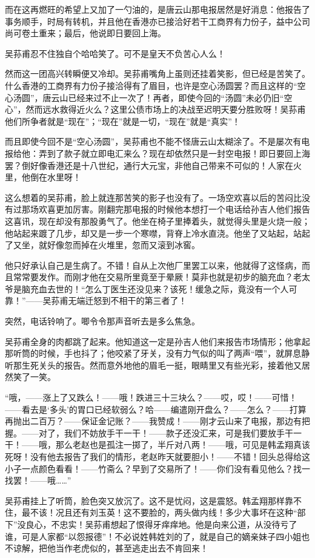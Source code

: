 \par 而在这再燃旺的希望上又加了一勺油的，是唐云山那电报居然是好消息：他报告了事务顺手，时局有转机，并且他在香港亦已接洽好若干工商界有力份子，益中公司尚可卷土重来；最后，他说即日要回上海。
\par 吴荪甫忍不住独自个哈哈笑了。可不是皇天不负苦心人么！
\par 然而这一团高兴转瞬便又冷却。吴荪甫嘴角上虽则还挂着笑影，但已经是苦笑了。什么香港的工商界有力份子接洽得有了眉目，也许是空心汤圆罢？而且这样的“空心汤圆”，唐云山已经来过不止一次了！再者，即使今回的“汤圆”未必仍旧“空心”，然而远水救得近火么？这里公债市场上的决战至迟明天要分胜败呀！吴荪甫他们所争者就是“现在”；“现在”就是一切，“现在”就是“真实”！
\par 而且即使今回不是“空心汤圆”，吴荪甫也不能不怪唐云山太糊涂了。不是屡次有电报给他：弄到了款子就立即电汇来么？现在却依然只是一封空电报！即日要回上海罢？倒好像香港还是十八世纪，通行大元宝，非他自己带来不可似的！人家在火里，他倒在水里呀！
\par 这么想着的吴荪甫，脸上就连那苦笑的影子也没有了。一场空欢喜以后的苦闷比没有过那场欢喜更加厉害。刚翻完那电报的时候他本想打一个电话给孙吉人他们报告这喜讯，现在却没有那股勇气了。他坐在椅子里捧着头，就觉得头里是火烧一般；他站起来踱了几步，却又是一步一个寒噤，背脊上冷水直浇。他坐了又站起，站起了又坐，就好像忽而掉在火堆里，忽而又滚到冰窖。
\par 他只好承认自己是生病了。不错！自从上次他厂里罢工以来，他就得了这怪病，而且常常要发作。而刚才他在交易所里竟至于晕厥！莫非也就是初步的脑充血？老太爷是脑充血去世的！“怎么丁医生还没见来？该死！缓急之际，竟没有一个人可靠！”——吴荪甫无端迁怒到不相干的第三者了！
\par 突然，电话铃响了。唧令令那声音听去是多么焦急。
\par 吴荪甫全身的肉都跳了起来。他知道这一定是孙吉人他们来报告市场情形；他拿起那听筒的时候，手也抖了；他咬紧了牙关，没有力气似的叫了两声“喂”，就屏息静听那生死关头的报告。然而意外地他的眉毛一挺，眼睛里又有些光彩，接着他又居然笑了一笑。
\par “哦，——涨上了又跌么！——哦！跌进三十三块么？——哎，哎！——可惜！——看去是‘多头’的胃口已经软弱么？哈——编遣刚开盘么？——怎么？——打算再抛出二百万？——保证金记账？——我赞成！——刚才云山来了电报，那边有把握。——对了，我们不妨放手干一干！——款子还没汇来，可是我们要放手干一干！——哦，那么老赵也是孤注一掷了，半斤对八两！——哦，可见是韩孟翔真该死呀！没有他去报告了我们的情形，老赵昨天就要胆小！——不错！回头总得给这小子一点颜色看看！——竹斋么？早到了交易所了！——你们没有看见他么？找一找罢！——哦……”
\par 吴荪甫挂上了听筒，脸色突又放沉了。这不是忧闷，这是震怒。韩孟翔那样靠不住，最不该！况且还有刘玉英！这不要脸的，两头做内线！多少大事坏在这种“部下”没良心，不忠实！吴荪甫想起了恨得牙痒痒地。他是向来公道，从没待亏了谁，可是人家都“以怨报德”！不必说姓韩姓刘的了，就是自己的嫡亲妹子四小姐也不谅解，把他当作老虎似的，甚至逃走出去不肯回来！
